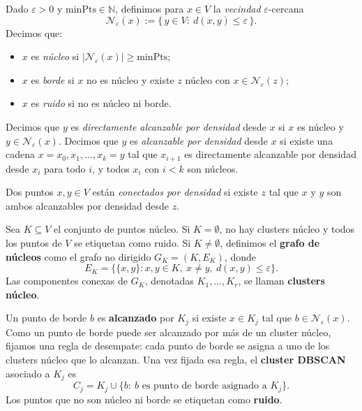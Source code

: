             \begin{definicion}
                Dado $\varepsilon>0$ y $\text{minPts}\in\mathbb{N}$, definimos para $x\in V$ la \emph{vecindad} $\varepsilon$-cercana
                \[
                \mathcal{N}_\varepsilon(x):=\{\,y\in V:\ d(x,y)\le \varepsilon\,\}.
                \]
                Decimos que:
                \begin{itemize}
                  \item $x$ es \emph{núcleo} si $|\mathcal{N}_\varepsilon(x)|\ge \text{minPts}$;
                  \item $x$ es \emph{borde} si $x$ no es núcleo y existe $z$ núcleo con $x\in \mathcal{N}_\varepsilon(z)$;
                  \item $x$ es \emph{ruido} si no es núcleo ni borde.
                \end{itemize}
            \end{definicion}

            \begin{definicion}
                Decimos que $y$ es \emph{directamente alcanzable por densidad} desde $x$ si $x$ es núcleo y $y\in \mathcal{N}_\varepsilon(x)$. Decimos que $y$ es \emph{alcanzable por densidad} desde $x$ si existe una cadena $x=x_0,x_1,\dots,x_k=y$ tal que $x_{i+1}$ es directamente alcanzable por densidad desde $x_i$ para todo $i$, y todos $x_i$ con $i<k$ son núcleos.
            \end{definicion}

            \begin{definicion}
                Dos puntos $x,y\in V$ están \emph{conectados por densidad} si existe $z$ tal que $x$ y $y$ son ambos alcanzables por densidad desde $z$.
            \end{definicion}

            \begin{definicion}
                Sea $K\subseteq V$ el conjunto de puntos núcleo. Si $K=\emptyset$, no hay clusters núcleo y todos los puntos de $V$ se etiquetan como ruido. Si $K\neq\emptyset$, definimos el \textbf{grafo de núcleos} como el grafo no dirigido $G_K=(K,E_K)$, donde
                \[
                    E_K=\{\{x,y\}:x,y\in K,\ x\neq y,\ d(x,y)\le\varepsilon\}.
                \]
                Las componentes conexas de $G_K$, denotadas $K_1,\dots,K_r$, se llaman \textbf{clusters núcleo}.

                Un punto de borde $b$ es \textbf{alcanzado} por $K_j$ si existe $x\in K_j$ tal que $b\in\mathcal{N}_\varepsilon(x)$. Como un punto de borde puede ser alcanzado por más de un cluster núcleo, fijamos una regla de desempate: cada punto de borde se asigna a uno de los clusters núcleo que lo alcanzan. Una vez fijada esa regla, el \textbf{cluster DBSCAN} asociado a $K_j$ es
                \[
                    C_j=K_j\cup\{b:\ b\text{ es punto de borde asignado a }K_j\}.
                \]
                Los puntos que no son núcleo ni borde se etiquetan como \textbf{ruido}.
            \end{definicion}

